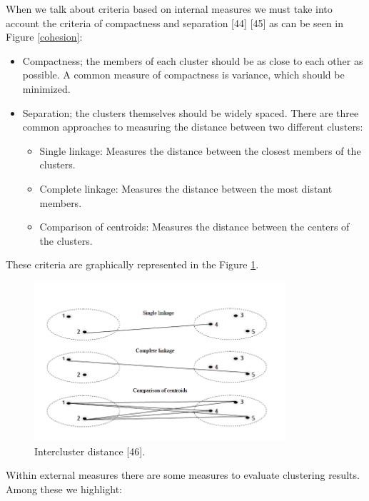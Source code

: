 \documentclass[
]{article}
\providecommand{\tightlist}{%
  \setlength{\itemsep}{0pt}\setlength{\parskip}{0pt}}
\begin{document}
When we talk about criteria based on internal measures we must take into
account the criteria of compactness and separation {[}44{]} {[}45{]} as
can be seen in Figure \ref{cohesion}:

\begin{itemize}
\tightlist
\item
  Compactness; the members of each cluster should be as close to each
  other as possible. A common measure of compactness is variance, which
  should be minimized.
\item
  Separation; the clusters themselves should be widely spaced. There are
  three common approaches to measuring the distance between two
  different clusters:

  \begin{itemize}
  \tightlist
  \item
    Single linkage: Measures the distance between the closest members of
    the clusters.
  \item
    Complete linkage: Measures the distance between the most distant
    members.
  \item
    Comparison of centroids: Measures the distance between the centers
    of the clusters.
  \end{itemize}
\end{itemize}

These criteria are graphically represented in the Figure
\ref{separation}.

\begin{figure}
\centering
\includegraphics[width=\textwidth,height=2.32292in]{img/separation.png}
\caption{Intercluster distance {[}46{]}. \label{separation}}
\end{figure}

Within external measures there are some measures to evaluate clustering
results. Among these we highlight:
\end{document}

